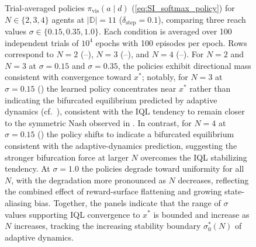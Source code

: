 \documentclass{article}
\begin{document}
\begin{figure}[ht!]
                        \caption{Trial-averaged policies $\pi_{\mathrm{vis}}(a\mid d)$ (\cref{eq:SI_softmax_policy}) for $N \in \{2,3,4\}$ agents at $|\mathbb{D}|=11$ ($\delta_{\mathrm{step}}=0.1$), comparing three reach values $\sigma \in \{0.15, 0.35, 1.0\}$. Each condition is averaged over 100 independent trials of $10^4$ epochs with 100 episodes per epoch. Rows correspond to $N=2$ (--), $N=3$ (--), and $N=4$ (--). For $N=2$ and $N=3$ at $\sigma=0.15$ and $\sigma=0.35$, the policies exhibit directional mass consistent with convergence toward $x^*$; notably, for $N=3$ at $\sigma=0.15$ () the learned policy concentrates near $x^*$ rather than indicating the bifurcated equilibrium predicted by adaptive dynamics (cf.\ ), consistent with the IQL tendency to remain closer to the symmetric Nash observed in . In contrast, for $N=4$ at $\sigma=0.15$ () the policy shifts to indicate a bifurcated equilibrium consistent with the adaptive-dynamics prediction, suggesting the stronger bifurcation force at larger $N$ overcomes the IQL stabilizing tendency. At $\sigma=1.0$ the policies degrade toward uniformity for all $N$, with the degradation more pronounced as $N$ decreases, reflecting the combined effect of reward-surface flattening and growing state-aliasing bias. Together, the panels indicate that the range of $\sigma$ values supporting IQL convergence to $x^*$ is bounded and increase as $N$ increases, tracking the increasing stability boundary $\sigma_0^*(N)$ of adaptive dynamics.}

                        \label{fig:qlearn_agents} 
                \end{figure}
\printbibliography
\end{document}
